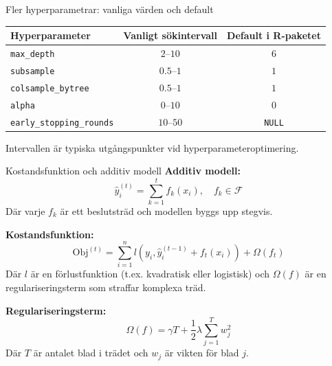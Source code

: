 \documentclass[10pt,english]{beamer}
\begin{document}
\begin{frame}{Fler hyperparametrar: vanliga värden och default}

  \centering
  \small

  \begin{tabular}{lcc}
    \hline
    \textbf{Hyperparameter}
      & \textbf{Vanligt sökintervall}
      & \textbf{Default i R-paketet} \\
    \hline
    \texttt{max\_depth}
      & $2$--$10$
      & $6$ \\
    \texttt{subsample}
      & $0.5$--$1$
      & $1$ \\
    \texttt{colsample\_bytree}
      & $0.5$--$1$
      & $1$ \\
    \texttt{alpha}
      & $0$--$10$
      & $0$ \\
    \texttt{early\_stopping\_rounds}
      & $10$--$50$
      & \texttt{NULL} \\
    \hline
  \end{tabular}

  \vspace{0.5cm}

  \footnotesize
  Intervallen är typiska utgångspunkter vid
  hyperparameteroptimering.

\end{frame}

\begin{frame}{Kostandsfunktion och additiv modell}
  \textbf{Additiv modell:}
  \begin{equation*}
    \hat{y}_i^{(t)} = \sum_{k=1}^{t} f_k(x_i), \quad f_k \in \mathcal{F}
  \end{equation*}
  Där varje \( f_k \) är ett beslutsträd och modellen byggs upp stegvis.

  \vspace{0.1cm}
  \textbf{Kostandsfunktion:}
  \begin{equation*}
    \text{Obj}^{(t)} = \sum_{i=1}^{n} l(y_i, \hat{y}_i^{(t-1)} + f_t(x_i)) + \Omega(f_t)
  \end{equation*}
  Där \( l \) är en förlustfunktion (t.ex. kvadratisk eller logistisk) och \( \Omega(f) \) är en regulariseringsterm som straffar komplexa träd.

  \vspace{0.1cm}
  \textbf{Regulariseringsterm:}
  \begin{equation*}
    \Omega(f) = \gamma T + \frac{1}{2} \lambda \sum_{j=1}^{T} w_j^2
  \end{equation*}
  Där \( T \) är antalet blad i trädet och \( w_j \) är vikten för blad \( j \).
\end{frame}
\end{document}
